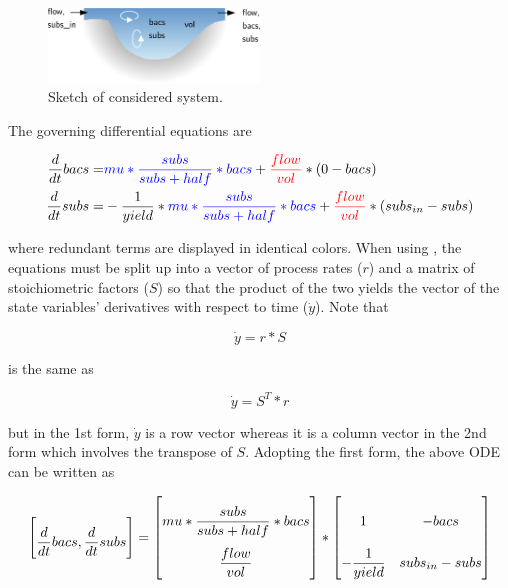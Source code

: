 \documentclass[onecolumn]{article}
\begin{document}
\begin{figure}
\centering
\includegraphics[width=0.5\textwidth]{reactor.pdf}
\caption{Sketch of considered system. \label{fig:reactor}}
\end{figure}

The governing differential equations are

\begin{align*}
  \frac{d}{d t}bacs = & \textcolor{blue}{mu * \frac{subs}{subs+half} * bacs} + \textcolor{red}{\frac{flow}{vol}} * (0-bacs)\\
  \frac{d}{d t}subs = & -\frac{1}{yield} * \textcolor{blue}{mu * \frac{subs}{subs+half} * bacs} + \textcolor{red}{\frac{flow}{vol}} * (subs_{in}-subs) \\
\end{align*}

where redundant terms are displayed in identical colors. When using , the equations must be split up into a vector of process rates ($r$) and a matrix of stoichiometric factors ($S$) so that the product of the two yields the vector of the state variables' derivatives with respect to time ($\dot{y}$). Note that

\begin{equation*}
\dot{y} = r * S
\end{equation*}

is the same as

\begin{equation*}
\dot{y} = S^T * r
\end{equation*}

but in the 1st form, $\dot{y}$ is a row vector whereas it is a column vector in the 2nd form which involves the transpose of $S$. Adopting the first form, the above ODE can be written as

\begin{align*}
\begingroup
\renewcommand*{\arraystretch}{2.5}
  \begin{bmatrix} \dfrac{d}{d t}bacs , \dfrac{d}{d t}subs \end{bmatrix} =
  \begin{bmatrix} mu * \dfrac{subs}{subs+half} * bacs \\ \dfrac{flow}{vol} \end{bmatrix} *
  \begin{bmatrix} 1 & -bacs \\ -\dfrac{1}{yield} & subs_{in}-subs \end{bmatrix}
\endgroup
\end{align*}
\end{document}

